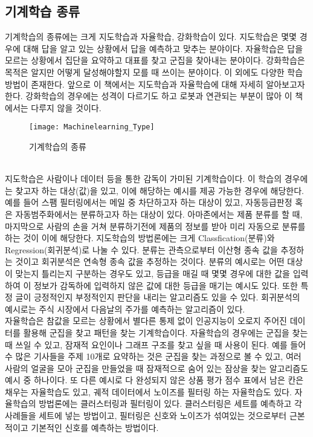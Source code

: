 \documentclass[a4paper]{oblivoir}
\begin{document}
\subsection{기계학습 종류}
기계학습의 종류에는 크게 지도학습과 자율학습, 강화학습이 있다. 지도학습은 몇몇 경우에 대해 답을 알고 있는 상황에서 답을 예측하고 맞추는 분야이다. 자율학습은 답을 모르는 상황에서 집단을 요약하고 대표를 찾고 군집을 찾아내는 분야이다. 강화학습은 목적은 알지만 어떻게 달성해야할지 모를 때 쓰이는 분야이다. 이 외에도 다양한 학습 방법이 존재한다. 앞으로 이 책에서는 지도학습과 자율학습에 대해 자세히 알아보고자 한다. 강화학습의 경우에는 성격이 다르기도 하고 로봇과 연관되는 부분이 많아 이 책에서는 다루지 않을 것이다.\\
\begin{figure}[ht]\centering
\texttt{[image: Machinelearning\_Type]}\caption{기계학습의 종류}\label{Fig:1-15}
\end{figure}\\
\indent 지도학습은 사람이나 데이터 등을 통한 감독이 가미된 기계학습이다. 이 학습의 경우에는 찾고자 하는 대상(값)을 있고, 이에 해당하는 예시를 제공 가능한 경우에 해당한다. 예를 들어 스팸 필터링에서는 메일 중 차단하고자 하는 대상이 있고, 자동등급판정 혹은 자동범주화에서는 분류하고자 하는 대상이 있다. 아마존에서는 제품 분류를 할 때, 마지막으로 사람의 손을 거쳐 분류하기전에 제품의 정보를 받아  미리 자동으로 분류를 하는 것이 이에 해당한다. 지도학습의 방법론에는 크게 Classfication(분류)와 Regression(회귀분석)로 나눌 수 있다. 분류는 관측으로부터 이산형 종속 값을 추정하는 것이고 회귀분석은 연속형 종속 값을 추정하는 것이다. 분류의 예시로는 어떤 대상이 맞는지 틀리는지 구분하는 경우도 있고, 등급을 매길 때 몇몇 경우에 대한 값을 입력하여 이 정보가 감독하에 입력하지 않은 값에 대한 등급을 매기는 예시도 있다. 또한 특정 글이 긍정적인지 부정적인지 판단을 내리는 알고리즘도 있을 수 있다. 회귀분석의 예시로는 주식 시장에서 다음날의 주가를 예측하는 알고리즘이 있다.\\

\indent 자율학습은 참값을 모르는 상황에서 별다른 통제 없이 인공지능이 오로지 주어진 데이터를 활용해 군집을 찾고 패턴을 찾는 기계학습이다. 자율학습의 경우에는 군집을 찾는 때 쓰일 수 있고, 잠재적 요인이나 그래프 구조를 찾고 싶을 때 사용이 된다. 예를 들어 수 많은 기사들을 주제 10개로 요약하는 것은 군집을 찾는 과정으로 볼 수 있고, 여러 사람의 얼굴을 모아 군집을 만들었을 때 잠재적으로 숨어 있는 잠상을 찾는 알고리즘도 예시 중 하나이다. 또 다른 예시로 다 완성되지 않은 상품 평가 점수 표에서 남은 칸은 채우는 자율학습도 있고, 궤적 데이터에서 노이즈를 필터링 하는 자율학습도 있다. 자율학습의 방법론에는 클러스터링과 필터링이 있다. 클러스터링은 세트를 예측하고 각 사례들을 세트에 넣는 방법이고, 필터링은 신호와 노이즈가 섞여있는 것으로부터 근본적이고 기본적인 신호를 예측하는 방법이다.\\\\
\end{document}
